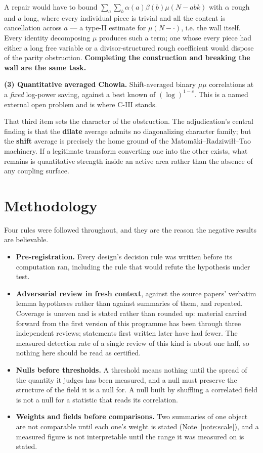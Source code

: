 \documentclass[11pt,a4paper]{article}
\theoremstyle{plain}
\theoremstyle{definition}
\theoremstyle{remark}
\begin{document}
A repair would have to bound
$\sum_a\sum_b\alpha(a)\beta(b)\mu(N-abk)$ with $\alpha$ rough and $a$
long, where every individual piece is trivial and all the content is
cancellation across $a$ --- a type-II estimate for $\mu(N-\cdot)$,
i.e. the wall itself. Every identity decomposing $\mu$ produces such a
term; one whose every piece had either a long free variable or a
divisor-structured rough coefficient would dispose of the parity
obstruction. \textbf{Completing the construction and breaking the wall
are the same task.}

\medskip\noindent
\textbf{(3) Quantitative averaged Chowla.} Shift-averaged binary
$\mu\mu$ correlations at a \emph{fixed} log-power saving, against a
best known of $(\log)^{1-c}$. This is a named external open problem
and is where C-III stands.

That third item sets the character of the obstruction. The
adjudication's central finding is that the \textbf{dilate} average
admits no diagonalizing character family; but the \textbf{shift}
average is precisely the home ground of the
Matom\"aki--Radziwi{\l}{\l}--Tao machinery. If a legitimate transform
converting one into the other exists, what remains is quantitative
strength inside an active area rather than the absence of any coupling
surface.

\section{Methodology}

Four rules were followed throughout, and they are the reason the
negative results are believable.

\begin{itemize}
\item \textbf{Pre-registration.} Every design's decision rule was
written before its computation ran, including the rule that would
refute the hypothesis under test.
\item \textbf{Adversarial review in fresh context}, against the source
papers' verbatim lemma hypotheses rather than against summaries of
them, and repeated. Coverage is uneven and is stated rather than
rounded up: material carried forward from the first version of this
programme has been through three independent reviews; statements first
written later have had fewer. The measured detection rate of a single
review of this kind is about one half, so nothing here should be read
as certified.
\item \textbf{Nulls before thresholds.} A threshold means nothing
until the spread of the quantity it judges has been measured, and a
null must preserve the structure of the field it is a null for. A null
built by shuffling a correlated field is not a null for a statistic
that reads its correlation.
\item \textbf{Weights and fields before comparisons.} Two summaries of
one object are not comparable until each one's weight is stated
(Note~\ref{note:scale}), and a measured figure is not interpretable
until the range it was measured on is stated.
\end{itemize}
\end{document}
